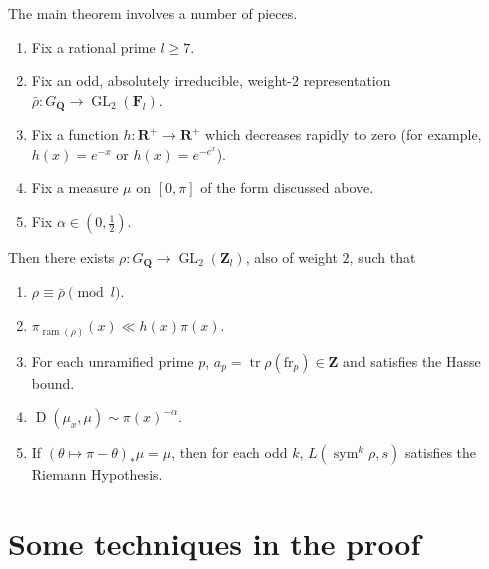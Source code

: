 \documentclass{article}
\DeclareMathOperator{\D}{D}
\DeclareMathOperator{\GL}{GL}
\DeclareMathOperator{\ram}{ram}
\DeclareMathOperator{\sym}{sym}
\DeclareMathOperator{\tr}{tr}
\newcommand{\bF}{\mathbf{F}}
\newcommand{\bQ}{\mathbf{Q}}
\newcommand{\bR}{\mathbf{R}}
\newcommand{\bZ}{\mathbf{Z}}
\newcommand{\frob}{\mathrm{fr}}
\begin{document}
The main theorem involves a number of pieces.
\begin{enumerate}
\item
Fix a rational prime $l\geqslant 7$. 

\item
Fix an odd, absolutely irreducible, weight-$2$ representation 
$\bar\rho\colon G_\bQ \to \GL_2(\bF_l)$. 

\item
Fix a function $h\colon \bR^+ \to \bR^+$ which decreases rapidly to zero (for 
example, $h(x) = e^{-x}$ or $h(x) = e^{-e^x}$). 

\item
Fix a measure $\mu$ on $[0,\pi]$ of the form discussed above. 

\item
Fix $\alpha\in \left(0,\frac 1 2\right)$. 
\end{enumerate}
Then there exists $\rho\colon G_\bQ \to \GL_2(\bZ_l)$, also of weight $2$, 
such that 
\begin{enumerate}
\item
$\rho\equiv \bar\rho\pmod l$. 

\item
$\pi_{\ram(\rho)}(x) \ll h(x) \pi(x)$. 

\item
For each unramified prime $p$, $a_p = \tr \rho(\frob_p)\in \bZ$ and satisfies 
the Hasse bound. 

\item
$\D(\mu_x,\mu) \sim \pi(x)^{-\alpha}$. 

\item
If $(\theta\mapsto \pi - \theta)_\ast \mu = \mu$, then for each odd 
$k$, $L(\sym^k \rho,s)$ satisfies the Riemann Hypothesis. 
\end{enumerate}





\section{Some techniques in the proof}
\end{document}
